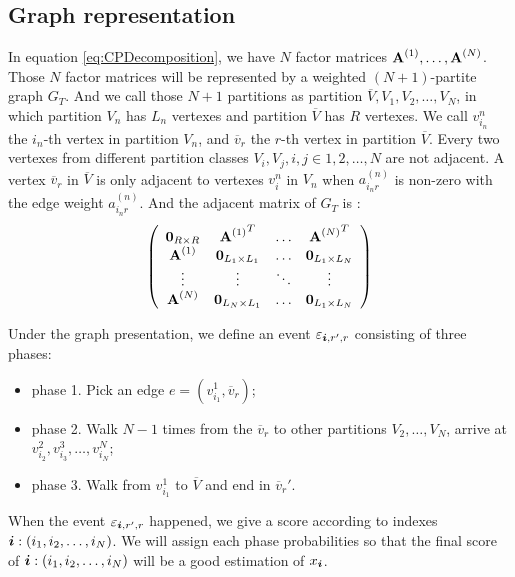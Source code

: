 \documentclass{article}
\newcommand{\Sca}[3]{{#1}^{(#2)}_{i_#2#3}}%
\newcommand{\V}[1]{{\bm{{\MakeLowercase{#1}}}}}%
\newcommand{\M}[1]{{\bm{\mathbf{\MakeUppercase{#1}}}}}%
\newcommand{\Mn}[2]{\M{#1}^{(#2)}}%
\begin{document}
\subsection{Graph representation}
In equation \ref{eq:CPDecomposition}, we have $N$ factor matrices $\Mn{A}{1},\dots,\Mn{A}{N}$.
Those $N$ factor matrices will be represented by a weighted $(N+1)$-partite graph $G_{T}$. And we call those $N+1$ partitions as partition $\overline{V},V_{1},V_{2},\ldots,V_{N}$, in which partition $V_{n}$ has $L_n$ vertexes and partition $\overline{V}$ has $R$ vertexes. We call $v^n_{i_n}$ the $i_n$-th vertex in partition $V_{n}$, and $\overline{v}_{r}$ the $r$-th vertex in partition $\overline{V}$. Every two vertexes from different partition classes $V_i,V_j,i,j\in {1,2,\ldots,N}$ are not adjacent. A vertex $\overline{v}_r$ in $\overline{V}$ is only adjacent to vertexes $v^n_i$ in $V_n$ when $\Sca{a}{n}{r}$ is non-zero with the edge weight $\Sca{a}{n}{r}$. And the adjacent matrix of $G_{T}$ is :
\[
\left(
  \begin{array}{cccc}
    \M{0}_{R\times R}   & {\Mn{A}{1}}^T         & \ldots & {\Mn{A}{N}}^T \\
    \Mn{A}{1}           & \M{0}_{L_1\times L_1} & \ldots & \M{0}_{L_1\times L_N} \\
    \vdots              & \vdots                & \ddots & \vdots \\
    \Mn{A}{N}           & \M{0}_{L_N\times L_1} & \ldots & \M{0}_{L_1\times L_N} \\
  \end{array}
\right)
\]

Under the graph presentation, we define an event $\varepsilon_{\V{i},r',r}$  consisting of three phases:
\begin{itemize}
  \item phase 1. Pick an edge $e=(v^1_{i_1},\overline{v}_r)$;
  \item phase 2. Walk $N-1$ times from the $\overline{v}_r$ to other partitions $V_2,\ldots,V_N$, arrive at $v^2_{i_2},v^3_{i_3},\ldots,v^N_{i_N}$;
  \item phase 3. Walk from $v^1_{i_1}$ to $\overline{V}$ and end in $\overline{v}_r'$.
\end{itemize}

When the event $\varepsilon_{\V{i},r',r}$ happened, we give a score according to indexes $\V{i}:(i_1,i_2,\ldots,i_N)$. We will assign each phase probabilities so that the final score of $\V{i}:(i_1,i_2,\ldots,i_N)$ will be a good estimation of $x_{\V{i}}$.
\end{document}
